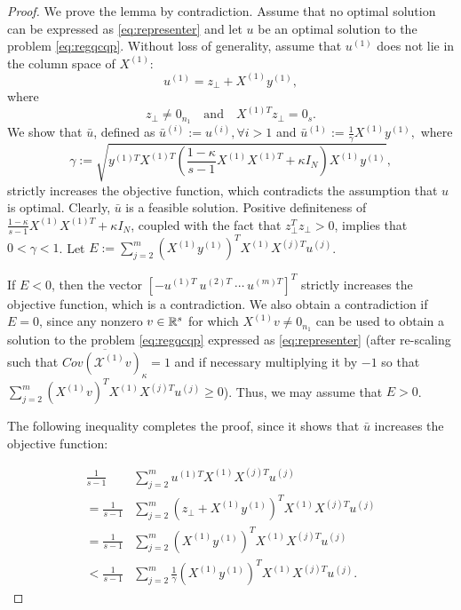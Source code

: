 \begin{proof}
We prove the lemma by contradiction. Assume that no optimal solution
can be expressed as \eqref{eq:representer} and let $u$ be an optimal solution to the
problem \eqref{eq:regqcqp}. Without loss of generality, assume
that $u^{(1)}$ does not lie in the column space of $X^{(1)}$:
 $$u^{(1)} = z_{\bot} + X^{(1)} y^{(1)},$$
 where $$z_{\bot} \neq 0_{n_1}\quad \text{and}\quad X^{(1)T}z_{\bot} = 0_s.$$
We show that $\bar{u}$, defined as $\bar{u}^{(i)} := u^{(i)}, \forall i> 1$
and $\bar{u}^{(1)} := \frac{1}{\gamma}  X^{(1)} y^{(1)},$ where
\begin{equation*}
\gamma :=\sqrt{ y^{(1)T} X^{(1)T} \left(\frac{1- \kappa}{s - 1}X^{(1)} X^{(1)T} + \kappa  I_N\right) X^{(1)} y^{(1)} },
\end{equation*}
strictly increases the objective function, which contradicts the assumption
that $u$ is optimal. Clearly, $\bar{u}$ is a feasible solution. Positive
definiteness of $\frac{1- \kappa}{s - 1}X^{(1)} X^{(1)T} + \kappa  I_N$,
coupled with the fact that $z_{\bot}^T z_{\bot} > 0$, implies that
$0 < \gamma < 1$. Let $E := \sum_{j = 2}^m \left(X^{(1)} y^{(1)}\right)^T X^{(1)}X^{(j)T} u^{(j)}$.

If $E < 0$, then the vector $[-u^{(1)T}~u^{(2)T}~\cdots~u^{(m)T}]^T$ strictly increases the
objective function, which is a contradiction. We also obtain a contradiction if $E = 0$,
since any nonzero $v \in \mathbb{R}^{s}$ for which $X^{(1)}v \neq 0_{n_1}$ can be used to obtain
a solution to the problem \eqref{eq:regqcqp} expressed as \eqref{eq:representer}
(after re-scaling  such that $\overline{Cov\left(\mathcal{X}^{(1)}v\right)_\kappa} = 1$
and if necessary multiplying it by $-1$ so that $\sum_{j = 2}^m \left(X^{(1)} v\right)^T X^{(1)}X^{(j)T} u^{(j)} \geq 0$).
Thus, we may assume that $E > 0$.

The following inequality completes the proof, since it shows that $\bar{u}$ increases the objective function:

\begin{align*}
 \frac{1}{s -1} & \sum_{j = 2}^m u^{(1)T} X^{(1)}X^{(j)T} u^{(j)} \\
  =  \frac{1}{s -1} & \sum_{j = 2}^m \left(z_{\bot} + X^{(1)} y^{(1)}\right)^T X^{(1)}X^{(j)T} u^{(j)} \\
  =  \frac{1}{s -1}  &\sum_{j = 2}^m \left(X^{(1)} y^{(1)}\right)^T X^{(1)}X^{(j)T} u^{(j)} \\
  <  \frac{1}{s -1}  &\sum_{j = 2}^m \frac{1}{\gamma}\left(X^{(1)} y^{(1)}\right)^T X^{(1)}X^{(j)T} u^{(j)}.
\end{align*}
\end{proof}

